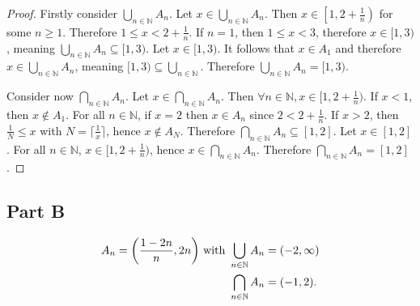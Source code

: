 \documentclass[12pt]{extarticle}
\begin{document}
\begin{proof}
	Firstly consider $\bigcup_{n \in \mathbb{N}} A_n$. Let $x \in \bigcup_{n \in \mathbb{N}} A_n$. Then $x \in \left[1, 2 + \frac{1}{n} \right)$ for some $n \geq 1$. Therefore $1 \leq x < 2 + \frac{1}{n}$. If $n = 1$, then $1 \leq x < 3$, therefore $x \in [1,3)$, meaning $\bigcup_{n \in \mathbb{N}} A_n \subseteq [1,3)$. Let $x \in [1,3)$. It follows that $x \in A_1$ and therefore $x \in \bigcup_{n \in \mathbb{N}} A_n$, meaning $[1,3) \subseteq \bigcup_{n \in \mathbb{N}}$. Therefore $\bigcup_{n \in \mathbb{N}} A_n = [1,3)$.

	\hfill\linebreak

	Consider now $\bigcap_{n \in \mathbb{N}} A_n$. Let $x \in \bigcap_{n \in \mathbb{N}} A_n$. Then $\forall n \in \mathbb{N}, x \in [1, 2 + \frac{1}{n})$. If $x < 1$, then $x \notin A_1$. For all $n \in \mathbb{N}$, if $x = 2$ then $x \in A_n$ since $2 < 2 + \frac{1}{n}$. If $x > 2$, then $\frac{1}{N} \leq x$ with $N = \lceil \frac{1}{x} \rceil$, hence $x \notin A_N$. Therefore $\bigcap_{n \in \mathbb{N}} A_n \subseteq [1,2]$. Let $x \in [1,2]$. For all $n \in \mathbb{N}$, $x \in [1,2 + \frac{1}{n})$, hence $x \in \bigcap_{n \in \mathbb{N}} A_n$. Therefore $\bigcap_{n \in \mathbb{N}} A_n = [1,2]$.
\end{proof}

\subsection*{Part B}

\begin{align*}
	A_n = \qty(\frac{1-2n}{n}, 2n) \text{ with } \bigcup\limits_{n \in \mathbb{N}} A_n &= (-2,\infty) \\
	\bigcap\limits_{n \in \mathbb{N}} A_n &= (-1, 2)
.\end{align*}
\end{document}
